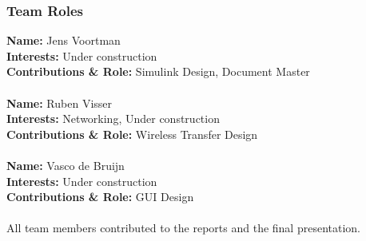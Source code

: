 \begin{small}
\subsubsection{Team Roles}
{\bfseries Name:} Jens Voortman\\
{\bfseries Interests:} Under construction\\
{\bfseries Contributions \& Role:} Simulink Design, Document Master\\\\
{\bfseries Name:} Ruben Visser\\
{\bfseries Interests:} Networking, Under construction\\
{\bfseries Contributions \& Role:} Wireless Transfer Design\\\\
{\bfseries Name:} Vasco de Bruijn\\
{\bfseries Interests:} Under construction\\
{\bfseries Contributions \& Role:} GUI Design\\\\
All team members contributed to the reports and the final presentation.


\end{small}
